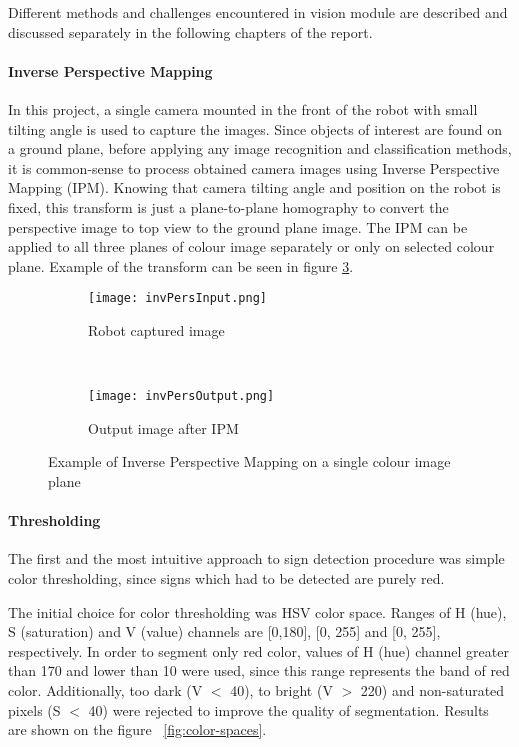 Different methods and challenges encountered in vision module are described and discussed separately in the following chapters of the report.
\paragraph{Inverse Perspective Mapping}

In this project, a single camera mounted in the front of the robot with small tilting angle is used to capture the images. Since objects of interest are found on a ground plane, before applying any image recognition and classification methods, it is common-sense to process obtained camera images using Inverse Perspective Mapping (IPM).
Knowing that camera tilting angle and position on the robot is fixed, this transform is just a  plane-to-plane homography to convert the perspective image to
top view to the ground plane image. The IPM can be applied to all three planes of colour image separately or only on selected colour plane. Example of the transform can be seen in figure \ref{fig:ipm_example}.
\begin{figure}[!ht]
	\centering
	\begin{subfigure}[b]{0.3\textwidth}
		\texttt{[image: invPersInput.png]}
		\caption{Robot captured image}
		\label{fig:}
	\end{subfigure}%
	~ 
	\begin{subfigure}[b]{0.3\textwidth}
		\texttt{[image: invPersOutput.png]}
		\caption{Output image after IPM}
		\label{fig:}
	\end{subfigure}
	\caption{Example of Inverse Perspective Mapping on a single colour image plane}
	\label{fig:ipm_example}
\end{figure}

\paragraph{Thresholding}

The first and the most intuitive approach to sign detection procedure was simple color thresholding, since signs which had to be detected are purely red.

The initial choice for color thresholding was HSV color space. Ranges of H (hue), S (saturation) and V (value) channels are [0,180], [0, 255] and [0, 255], respectively. In order to segment only red color, values of H (hue) channel greater than 170 and lower than 10 were used, since this range represents the band of red color. Additionally, too dark (V $ < $ 40), to bright (V $ > $ 220) and non-saturated pixels (S $ < $ 40) were rejected to improve the quality of segmentation. Results are shown on the figure ~\ref{fig:color-spaces}.

